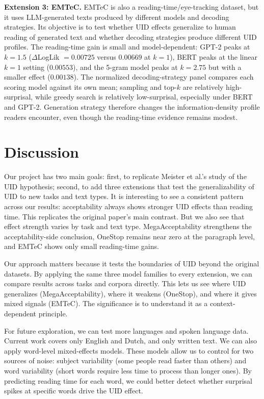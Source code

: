 \documentclass{article}
\begin{document}
\textbf{Extension 3: EMTeC.} EMTeC is also a reading-time/eye-tracking dataset, but it uses LLM-generated texts produced by different models and decoding strategies. Its objective is to test whether UID effects generalize to human reading of generated text and whether decoding strategies produce different UID profiles. The reading-time gain is small and model-dependent: GPT-2 peaks at $k=1.5$ ($\Delta$LogLik $=0.00725$ versus $0.00669$ at $k=1$), BERT peaks at the linear $k=1$ setting ($0.00553$), and the 5-gram model peaks at $k=2.75$ but with a smaller effect ($0.00138$). The normalized decoding-strategy panel compares each scoring model against its own mean; sampling and top-$k$ are relatively high-surprisal, while greedy search is relatively low-surprisal, especially under BERT and GPT-2. Generation strategy therefore changes the information-density profile readers encounter, even though the reading-time evidence remains modest.

\section{Discussion}

Our project has two main goals: first, to replicate Meister et al.'s study of the UID hypothesis; second, to add three extensions that test the generalizability of UID to new tasks and text types. It is interesting to see a consistent pattern across our results: acceptability always shows stronger UID effects than reading time. This replicates the original paper's main contrast. But we also see that effect strength varies by task and text type. MegaAcceptability strengthens the acceptability-side conclusion, OneStop remains near zero at the paragraph level, and EMTeC shows only small reading-time gains.

Our approach matters because it tests the boundaries of UID beyond the original datasets. By applying the same three model families to every extension, we can compare results across tasks and corpora directly. This lets us see where UID generalizes (MegaAcceptability), where it weakens (OneStop), and where it gives mixed signals (EMTeC). The significance is to understand it as a context-dependent principle.

For future exploration, we can test more languages and spoken language data. Current work covers only English and Dutch, and only written text. We can also apply word-level mixed-effects models. These models allow us to control for two sources of noise: subject variability (some people read faster than others) and word variability (short words require less time to process than longer ones). By predicting reading time for each word, we could better detect whether surprisal spikes at specific words drive the UID effect.
\end{document}
